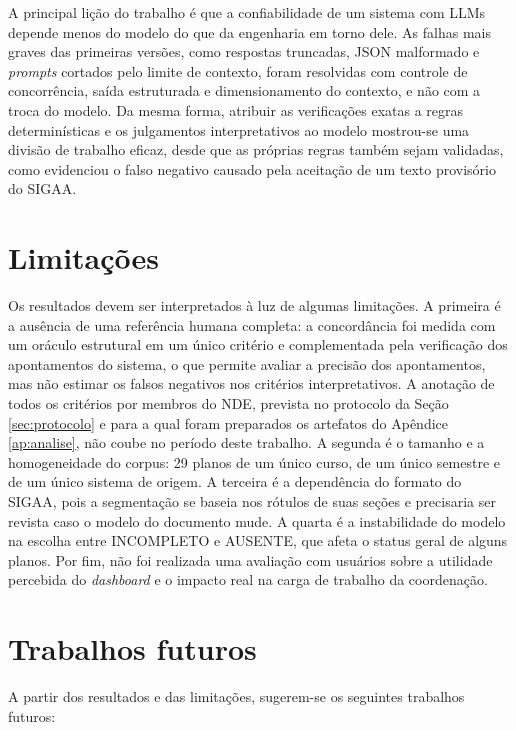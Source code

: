 A principal lição do trabalho é que a confiabilidade de um sistema com LLMs depende menos do modelo do que da engenharia em torno dele. As falhas mais graves das primeiras versões, como respostas truncadas, JSON malformado e \textit{prompts} cortados pelo limite de contexto, foram resolvidas com controle de concorrência, saída estruturada e dimensionamento do contexto, e não com a troca do modelo. Da mesma forma, atribuir as verificações exatas a regras determinísticas e os julgamentos interpretativos ao modelo mostrou-se uma divisão de trabalho eficaz, desde que as próprias regras também sejam validadas, como evidenciou o falso negativo causado pela aceitação de um texto provisório do SIGAA.

\section{Limitações}

Os resultados devem ser interpretados à luz de algumas limitações. A primeira é a ausência de uma referência humana completa: a concordância foi medida com um oráculo estrutural em um único critério e complementada pela verificação dos apontamentos do sistema, o que permite avaliar a precisão dos apontamentos, mas não estimar os falsos negativos nos critérios interpretativos. A anotação de todos os critérios por membros do NDE, prevista no protocolo da Seção \ref{sec:protocolo} e para a qual foram preparados os artefatos do Apêndice \ref{ap:analise}, não coube no período deste trabalho. A segunda é o tamanho e a homogeneidade do corpus: 29 planos de um único curso, de um único semestre e de um único sistema de origem. A terceira é a dependência do formato do SIGAA, pois a segmentação se baseia nos rótulos de suas seções e precisaria ser revista caso o modelo do documento mude. A quarta é a instabilidade do modelo na escolha entre INCOMPLETO e AUSENTE, que afeta o status geral de alguns planos. Por fim, não foi realizada uma avaliação com usuários sobre a utilidade percebida do \textit{dashboard} e o impacto real na carga de trabalho da coordenação.

\section{Trabalhos futuros}
\label{sec:futuros}

A partir dos resultados e das limitações, sugerem-se os seguintes trabalhos futuros:

